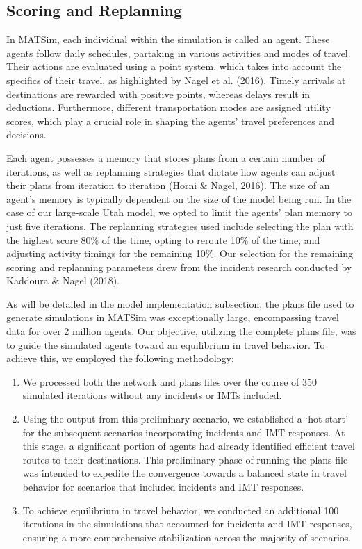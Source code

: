 \documentclass[fancy, oneside, mastersfancy, ms]{byuthesis}
\providecommand{\tightlist}{%
  \setlength{\itemsep}{0pt}\setlength{\parskip}{0pt}}\usepackage{longtable,booktabs,array}
\begin{document}
\hypertarget{sec-MATSim_Score}{%
\subsection{Scoring and Replanning}\label{sec-MATSim_Score}}

In MATSim, each individual within the simulation is called an agent.
These agents follow daily schedules, partaking in various activities and
modes of travel. Their actions are evaluated using a point system, which
takes into account the specifics of their travel, as highlighted by
Nagel et al. (2016). Timely arrivals at destinations are rewarded with
positive points, whereas delays result in deductions. Furthermore,
different transportation modes are assigned utility scores, which play a
crucial role in shaping the agents' travel preferences and decisions.

Each agent possesses a memory that stores plans from a certain number of
iterations, as well as replanning strategies that dictate how agents can
adjust their plans from iteration to iteration (Horni \& Nagel, 2016).
The size of an agent's memory is typically dependent on the size of the
model being run. In the case of our large-scale Utah model, we opted to
limit the agents' plan memory to just five iterations. The replanning
strategies used include selecting the plan with the highest score 80\%
of the time, opting to reroute 10\% of the time, and adjusting activity
timings for the remaining 10\%. Our selection for the remaining scoring
and replanning parameters drew from the incident research conducted by
Kaddoura \& Nagel (2018).

As will be detailed in the \protect\hyperlink{sec-model_imp}{model
implementation} subsection, the plans file used to generate simulations
in MATSim was exceptionally large, encompassing travel data for over 2
million agents. Our objective, utilizing the complete plans file, was to
guide the simulated agents toward an equilibrium in travel behavior. To
achieve this, we employed the following methodology:

\begin{enumerate}
\def\labelenumi{\arabic{enumi}.}
\tightlist
\item
  We processed both the network and plans files over the course of 350
  simulated iterations without any incidents or IMTs included.
\item
  Using the output from this preliminary scenario, we established a `hot
  start' for the subsequent scenarios incorporating incidents and IMT
  responses. At this stage, a significant portion of agents had already
  identified efficient travel routes to their destinations. This
  preliminary phase of running the plans file was intended to expedite
  the convergence towards a balanced state in travel behavior for
  scenarios that included incidents and IMT responses.
\item
  To achieve equilibrium in travel behavior, we conducted an additional
  100 iterations in the simulations that accounted for incidents and IMT
  responses, ensuring a more comprehensive stabilization across the
  majority of scenarios.
\end{enumerate}
\end{document}
